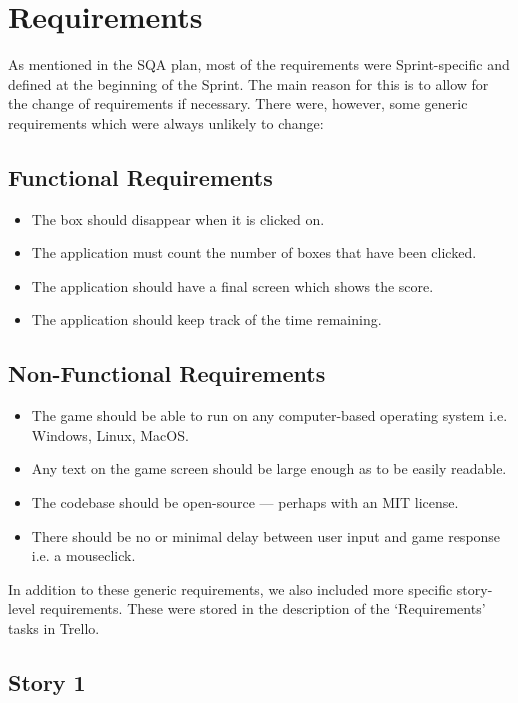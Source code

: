 \documentclass[12pt]{article}
\begin{document}
\section{Requirements}

As mentioned in the SQA plan, most of the requirements were Sprint-specific and defined at the beginning of the Sprint. The main reason for this is to allow for the change of requirements if necessary. There were, however, some generic requirements which were always unlikely to change:

\subsection{Functional Requirements}

\begin{itemize}
    \item The box should disappear when it is clicked on.
    \item The application must count the number of boxes that have been clicked.
    \item The application should have a final screen which shows the score.
    \item The application should keep track of the time remaining.
\end{itemize}

\subsection{Non-Functional Requirements}

\begin{itemize}
    \item The game should be able to run on any computer-based operating system i.e. Windows, Linux, MacOS.
    \item Any text on the game screen should be large enough as to be easily readable.
    \item The codebase should be open-source --- perhaps with an MIT license.
    \item There should be no or minimal delay between user input and game response i.e. a mouseclick.
\end{itemize}

In addition to these generic requirements, we also included more specific story-level requirements. These were stored in the description of the `Requirements' tasks in Trello.

\subsection{Story 1}
\end{document}
